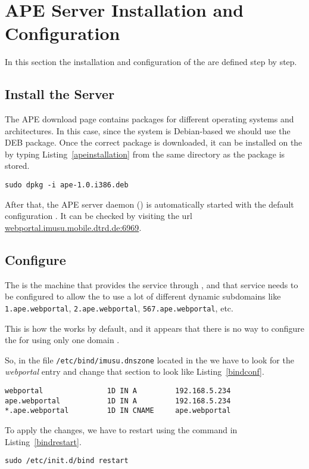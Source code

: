 \section{APE Server Installation and Configuration}
\label{sec:apeconfig}

In this section the installation and configuration of the
 are defined step by step.

\subsection{Install the Server}

The APE download page \cite{ApeDownload} contains packages for different
operating systems and architectures. In this case, since the system is
Debian-based we should use the DEB package.
Once the correct package is downloaded, it can be installed on the
 by typing Listing~\ref{apeinstallation} from the same
directory as the package is stored.

\begin{lstlisting}[label=apeinstallation,caption=APE installation command]
sudo dpkg -i ape-1.0.i386.deb
\end{lstlisting}

After that, the APE server daemon () is automatically started with
the default configuration \cite{ApeSetup}. It can be checked by visiting the
url \url{webportal.imusu.mobile.dtrd.de:6969}.

\subsection{Configure }

The  is the machine that provides the  service through
, and that service needs to be configured to allow the
 to use a lot of different dynamic subdomains like
\verb|1.ape.webportal|, \verb|2.ape.webportal|, \verb|567.ape.webportal|,
etc.

This is how the  works by default, and it appears that there
is no way to configure the  for using only one domain
\cite{ApeConfig}.

So, in the file \verb|/etc/bind/imusu.dnszone| located in the 
we have to look for the \emph{webportal} entry and change that section to look
like Listing~\ref{bindconf}.

\begin{lstlisting}[label=bindconf,caption=BIND configuration]
webportal               1D IN A         192.168.5.234
ape.webportal           1D IN A         192.168.5.234
*.ape.webportal         1D IN CNAME     ape.webportal
\end{lstlisting}

To apply the changes, we have to restart  using the command in
Listing~\ref{bindrestart}.

\begin{lstlisting}[label=bindrestart,caption=BIND restart command]
sudo /etc/init.d/bind restart
\end{lstlisting}
